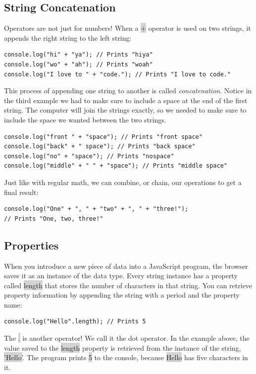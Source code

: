 \documentclass[11pt]{article}
\begin{document}
\subsection{String Concatenation}
Operators are not just for numbers! When a \colorbox{lightgray}{$+$} operator is used on two strings, it appends the right string to the left string:
\begin{lstlisting}
console.log("hi" + "ya"); // Prints "hiya"
console.log("wo" + "ah"); // Prints "woah"
console.log("I love to " + "code."); // Prints "I love to code."
\end{lstlisting}
This process of appending one string to another is called \textit{concatenation}. Notice in the third example we had to make sure to include a space at the end of the first string. The computer will join the strings exactly, so we needed to make sure to include the space we wanted between the two strings.
\begin{lstlisting}
console.log("front " + "space"); // Prints "front space"
console.log("back" + " space"); // Prints "back space"
console.log("no" + "space"); // Prints "nospace"
console.log("middle" + " " + "space"); // Prints "middle space"
\end{lstlisting}
Just like with regular math, we can combine, or chain, our operations to get a final result:
\begin{lstlisting}
console.log("One" + ", " + "two" + ", " + "three!"); 
// Prints "One, two, three!"
\end{lstlisting}
\subsection{Properties}
When you introduce a new piece of data into a JavaScript program, the browser saves it as an instance of the data type. Every string instance has a property called \colorbox{lightgray}{length} that stores the number of characters in that string. You can retrieve property information by appending the string with a period and the property name:
\begin{lstlisting}
console.log("Hello".length); // Prints 5
\end{lstlisting}
The \colorbox{lightgray}{$.$} is another operator! We call it the dot operator. In the example above, the value saved to the \colorbox{lightgray}{length} property is retrieved from the instance of the string, \colorbox{lightgray}{'Hello'}. The program prints \colorbox{lightgray}{5} to the console, because \colorbox{lightgray}{Hello} has five characters in it.
\end{document}
